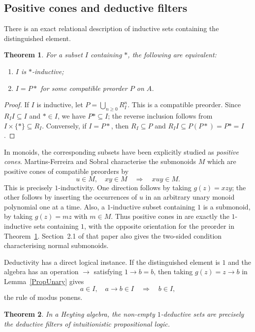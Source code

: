 \documentclass[12pt,english]{amsart}
\newtheorem{theorem}{Theorem}[section]
\theoremstyle{definition}
\numberwithin{equation}{section}
\theoremstyle{remark}
\renewcommand{\top}{\ast}
\begin{document}
\subsection{Positive cones and deductive filters}

There is an exact relational description of inductive sets containing the distinguished element.

\begin{theorem}\label{PropPreorder}
For a subset $I$ containing $\top$, the following are equivalent:
\begin{enumerate}
\item $I$ is $\top$-inductive;
\item $I=P\top$ for some compatible preorder $P$ on $A$.
\end{enumerate}
\end{theorem}

\begin{proof}
If $I$ is inductive, let $P=\bigcup_{n\geqslant0}R_I^n$. This is a compatible preorder. Since $R_I I\subseteq I$ and $\top\in I$, we have $P\top\subseteq I$; the reverse inclusion follows from $I\times\{\top\}\subseteq R_I$. Conversely, if $I=P\top$, then $R_I\subseteq P$ and $R_I I\subseteq P(P\top)=P\top=I$.
\end{proof}

In monoids, the corresponding subsets have been explicitly studied as \emph{positive cones}. Martins-Ferreira and Sobral \cite[Section 2.2]{MS23} characterise the submonoids $M$ which are positive cones of compatible preorders by
\[
u\in M,\quad xy\in M\quad\Longrightarrow\quad xuy\in M.
\]
This is precisely $1$-inductivity. One direction follows by taking $g(z)=xzy$; the other follows by inserting the occurrences of $u$ in an arbitrary unary monoid polynomial one at a time. Also, a $1$-inductive subset containing $1$ is a submonoid, by taking $g(z)=mz$ with $m\in M$. Thus positive cones in \cite{MS23} are exactly the $1$-inductive sets containing $1$, with the opposite orientation for the preorder in Theorem~\ref{PropPreorder}. Section~2.1 of that paper also gives the two-sided condition characterising normal submonoids.

Deductivity has a direct logical instance. If the distinguished element is $1$ and the algebra has an operation $\to$ satisfying $1\to b=b$, then taking $g(z)=z\to b$ in Lemma~\ref{PropUnary} gives
\[
a\in I,\quad a\to b\in I\quad\Longrightarrow\quad b\in I,
\]
the rule of modus ponens.

\begin{theorem}\label{PropHeyting}
In a Heyting algebra, the non-empty $1$-deductive sets are precisely the deductive filters of intuitionistic propositional logic.
\end{theorem}
\end{document}
